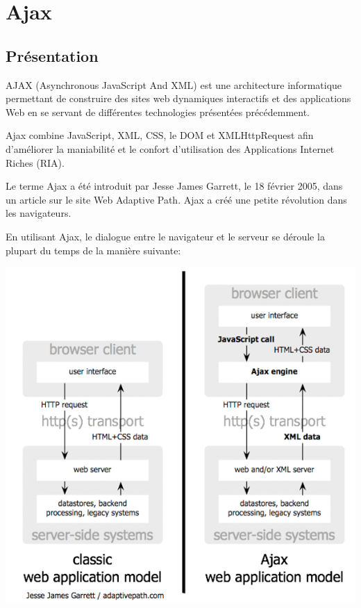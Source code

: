 \section{Ajax}
\label{ch:ajax}

\subsection{Présentation}

AJAX (Asynchronous JavaScript And XML) est une architecture informatique permettant de construire des sites web dynamiques interactifs et des applications Web en se servant de différentes technologies présentées précédemment.

Ajax combine JavaScript, XML, CSS, le DOM et XMLHttpRequest afin d’améliorer la maniabilité et le confort d’utilisation des Applications Internet Riches (RIA).

Le terme Ajax a été introduit par Jesse James Garrett, le 18 février 2005, dans un article sur le site Web Adaptive Path. Ajax a créé une petite révolution dans les navigateurs.

En utilisant Ajax, le dialogue entre le navigateur et le serveur se déroule la plupart du temps de la manière suivante:

\begin{center}
\includegraphics[scale=0.6]{img/ajax.png}
\label{Graphique technologie ajax}
\end{center}
 


